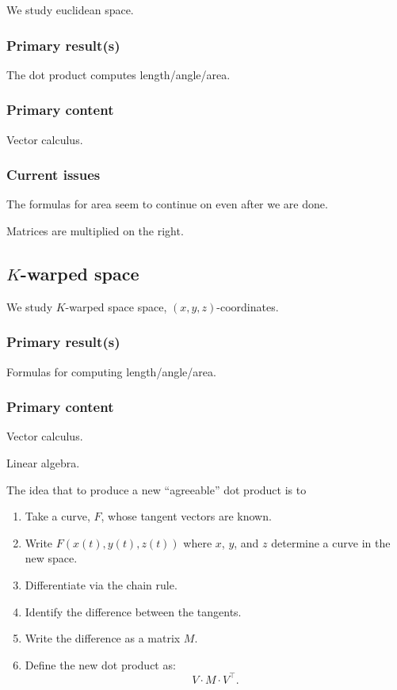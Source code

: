 \documentclass{amsart}
\newcommand{\transpose}{\intercal}
\begin{document}
We study euclidean space.


\subsubsection{Primary result(s)}

The dot product computes length/angle/area.

\subsubsection{Primary content}

Vector calculus.

\subsubsection{Current issues}

The formulas for area seem to continue on even after we are done.

Matrices are multiplied on the right.



\subsection{$K$-warped space}

We study $K$-warped space space, $(x,y,z)$-coordinates.


\subsubsection{Primary result(s)}

Formulas for computing length/angle/area.

\subsubsection{Primary content}

Vector calculus.

Linear algebra.

The idea that to produce a new ``agreeable'' dot product is to
\begin{enumerate}
\item Take a curve, $F$, whose tangent vectors are known.
\item Write $F(x(t),y(t),z(t))$ where $x$, $y$, and $z$ determine a curve in the new space.
\item Differentiate via the chain rule.
\item Identify the difference between the tangents.
\item Write the difference as a matrix $M$.
\item Define the new dot product as:
  \[
V\cdot M \cdot V^\transpose.
\]
\end{enumerate}
\end{document}
